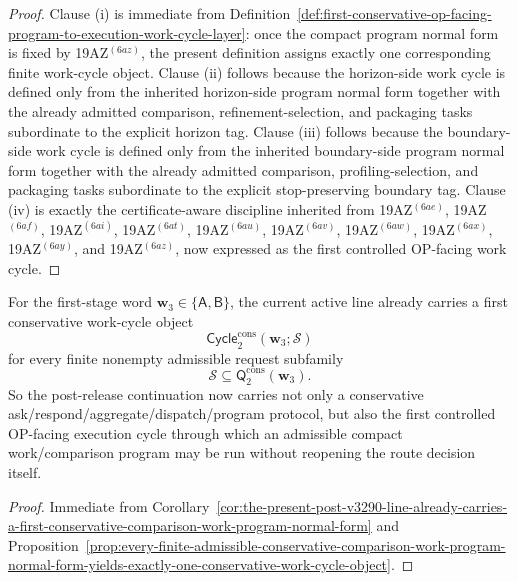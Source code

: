 \begin{proof}
Clause (i) is immediate from Definition~\ref{def:first-conservative-op-facing-program-to-execution-work-cycle-layer}: once the compact program normal form is fixed by 19AZ$^{(6az)}$, the present definition assigns exactly one corresponding finite work-cycle object. Clause (ii) follows because the horizon-side work cycle is defined only from the inherited horizon-side program normal form together with the already admitted comparison, refinement-selection, and packaging tasks subordinate to the explicit horizon tag. Clause (iii) follows because the boundary-side work cycle is defined only from the inherited boundary-side program normal form together with the already admitted comparison, profiling-selection, and packaging tasks subordinate to the explicit stop-preserving boundary tag. Clause (iv) is exactly the certificate-aware discipline inherited from 19AZ$^{(6ae)}$, 19AZ$^{(6af)}$, 19AZ$^{(6ai)}$, 19AZ$^{(6at)}$, 19AZ$^{(6au)}$, 19AZ$^{(6av)}$, 19AZ$^{(6aw)}$, 19AZ$^{(6ax)}$, 19AZ$^{(6ay)}$, and 19AZ$^{(6az)}$, now expressed as the first controlled OP-facing work cycle.
\end{proof}

\begin{corollary}
\label{cor:the-present-post-v3290-line-already-carries-a-first-conservative-work-cycle}
For the first-stage word \(\mathbf w_3\in\{\mathsf A,\mathsf B\}\), the current active line already carries a first conservative work-cycle object
\[
  \mathsf{Cycle}^{\mathrm{cons}}_{2}(\mathbf w_3;\mathcal S)
\]
for every finite nonempty admissible request subfamily
\[
  \mathcal S\subseteq \mathsf{Q}^{\mathrm{cons}}_{2}(\mathbf w_3).
\]
So the post-release continuation now carries not only a conservative ask/respond/aggregate/dispatch/program protocol, but also the first controlled OP-facing execution cycle through which an admissible compact work/comparison program may be run without reopening the route decision itself.
\end{corollary}

\begin{proof}
Immediate from Corollary~\ref{cor:the-present-post-v3290-line-already-carries-a-first-conservative-comparison-work-program-normal-form} and Proposition~\ref{prop:every-finite-admissible-conservative-comparison-work-program-normal-form-yields-exactly-one-conservative-work-cycle-object}.
\end{proof}

